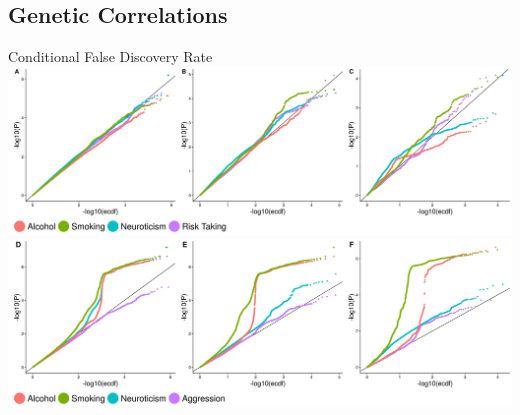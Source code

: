 \documentclass{beamer}
\begin{document}
  \subsection{Genetic Correlations}

  \begin{frame}[t]{Conditional False Discovery Rate}
    \includegraphics[width=1\linewidth]{../ukb_assoc/figure/cFDR/agg_cond.jpeg} \\
    \includegraphics[width=1\linewidth]{../ukb_assoc/figure/cFDR/risk_cond.jpeg}
  \end{frame}
\end{document}
